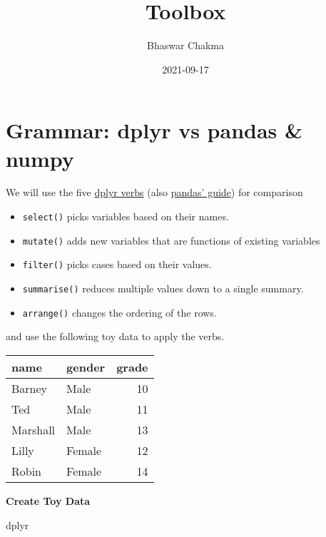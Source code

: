 \documentclass[
]{book}
\title{Toolbox}
\author{Bhaswar Chakma}
\date{2021-09-17}
\begin{document}
\maketitle

{
\setcounter{tocdepth}{1}
\tableofcontents
}
\hypertarget{section}{%
\chapter*{}\label{section}}

\hypertarget{grammar-dplyr-vs-pandas-numpy}{%
\chapter{Grammar: dplyr vs pandas \& numpy}\label{grammar-dplyr-vs-pandas-numpy}}

We will use the five \href{https://dplyr.tidyverse.org/}{dplyr verbs} (also \href{https://pandas.pydata.org/pandas-docs/stable/getting_started/comparison/comparison_with_r.html}{pandas' guide}) for comparison

\begin{itemize}
\item
  \texttt{select()} picks variables based on their names.
\item
  \texttt{mutate()} adds new variables that are functions of existing variables
\item
  \texttt{filter()} picks cases based on their values.
\item
  \texttt{summarise()} reduces multiple values down to a single summary.
\item
  \texttt{arrange()} changes the ordering of the rows.
\end{itemize}

and use the following toy data to apply the verbs.

\begin{longtable}[]{@{}llr@{}}
\toprule
name & gender & grade \\
\midrule
\endhead
Barney & Male & 10 \\
Ted & Male & 11 \\
Marshall & Male & 13 \\
Lilly & Female & 12 \\
Robin & Female & 14 \\
\bottomrule
\end{longtable}

{\textbf{Create Toy Data}}

dplyr
\end{document}
